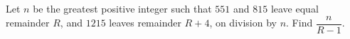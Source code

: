 Let $n$ be the greatest positive integer such that $551$ and $815$ leave equal remainder $R$, and $1215$ leaves remainder $R+4$, on division by $n$. Find $\dfrac{n}{R-1}$.
